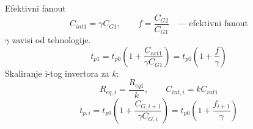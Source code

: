 \begin{frame}[label=09_3-s017]{Efektivni fanout}
\[C_{int1}=\gamma C_{G1},\qquad f=\frac{C_{G2}}{C_{G1}}\quad\text{— efektivni fanout}\]
$\gamma$ zavisi od tehnologije.
\[t_{p1}=t_{p0}\left(1+\frac{C_{ext1}}{\gamma C_{G1}}\right)
=t_{p0}\left(1+\frac f\gamma\right)\]
Skaliranje i-tog invertora za $k$:
\[R_{eq,i}=\frac{R_{eq1}}k,\qquad C_{int,i}=kC_{int1}\]
\[t_{p,i}=t_{p0}\left(1+\frac{C_{G,i+1}}{\gamma C_{G,i}}\right)
=t_{p0}\left(1+\frac{f_{i+1}}\gamma\right)\]
\end{frame}
